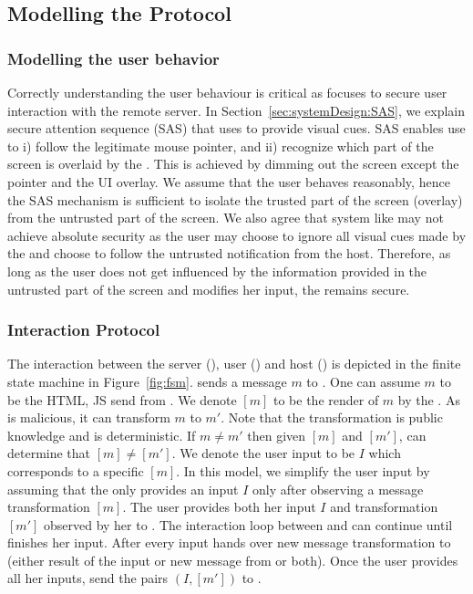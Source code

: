 \subsection{Modelling the Protocol}
\label{sec:securityAnalysis:modelling}

\subsubsection{Modelling the user behavior}
\label{sec:securityAnalysis:modelling:user}

Correctly understanding the user behaviour is critical as \name focuses to secure user interaction with the remote server. In Section~\ref{sec:systemDesign:SAS}, we explain secure attention sequence (SAS) that \name uses to provide visual cues. SAS enables use to i) follow the legitimate mouse pointer, and ii) recognize which part of the screen is overlaid by the \device. This is achieved by dimming out the screen except the pointer and the UI overlay. We assume that the user behaves reasonably, hence the SAS mechanism is sufficient to isolate the trusted part of the screen (\device overlay) from the untrusted part of the screen. We also agree that system like \name may not achieve absolute security as the user may choose to ignore all visual cues made by the \device and choose to follow the untrusted notification from the host. Therefore, as long as the user does not get influenced by the information provided in the untrusted part of the screen and modifies her input, the \name remains secure.

\subsubsection{Interaction Protocol} 
The interaction between the server (\server), user (\user) and host (\host) is depicted in the finite state machine in Figure~\ref{fig:fsm}. \server sends a message $m$ to \host. One can assume $m$ to be the HTML, JS send from \server. We denote $[m]$ to be the render of $m$ by the \host. As \host is malicious, it can transform $m$ to $m'$. Note that the transformation is public knowledge and is deterministic. If $m\neq m'$ then given $[m]$ and $[m']$, \server can determine that $[m]\neq [m']$. We denote the user input to be $I$ which corresponds to a specific $[m]$. 
In this model, we simplify the user input by assuming that the \user only provides an input $I$ only after observing a message transformation $[m]$. The user provides both her input $I$ and transformation $[m']$ observed by her to \host. The interaction loop between \host and \user can continue until \user finishes her input. After every input \host hands over new message transformation to \user (either result of the input or new message from \server or both). Once the user provides all her inputs, \host send the pairs $(I, [m'])$ to \server.

